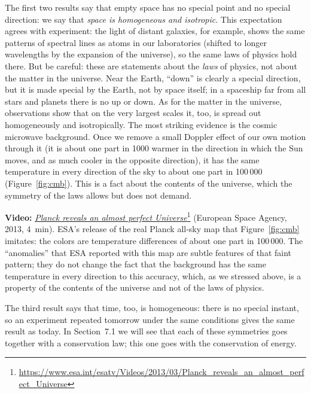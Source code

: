 \documentclass[11pt,a4paper]{article}
\begin{document}
The first two results say that empty space has no special point and no special direction: we say
that \emph{space is homogeneous and isotropic}. This expectation agrees with experiment: the light
of distant galaxies, for example, shows the same patterns of spectral lines as atoms in our
laboratories (shifted to longer wavelengths by the expansion of the universe), so the same laws of
physics hold there. But be careful: these are statements about the \emph{laws} of physics, not
about the matter in the universe. Near the Earth, ``down'' is clearly a special direction, but it is
made special by the Earth, not by space itself; in a spaceship far from all stars and planets there
is no up or down. As for the matter in the universe, observations show that on the very largest
scales it, too, is spread out homogeneously and isotropically. The most striking evidence is the
cosmic microwave background. Once we remove a small Doppler effect of our own motion through it (it
is about one part in 1000 warmer in the direction in which the Sun moves, and as much cooler in the
opposite direction), it has the same temperature in every direction of the sky to about one part in
100\,000 (Figure~\ref{fig:cmb}). This is a fact about the contents of the universe, which the
symmetry of the laws allows but does not demand.

\begin{aside}
\textbf{Video:}
\href{https://www.esa.int/esatv/Videos/2013/03/Planck_reveals_an_almost_perfect_Universe}{\emph{Planck
reveals an almost perfect
Universe}}\footnote{\url{https://www.esa.int/esatv/Videos/2013/03/Planck_reveals_an_almost_perfect_Universe}}
(European Space Agency, 2013, 4~min). ESA's release of the real Planck all-sky map that
Figure~\ref{fig:cmb} imitates: the colors are temperature differences of about one part in
100\,000. The ``anomalies'' that ESA reported with this map are subtle features of that faint
pattern; they do not change the fact that the background has the same temperature in every
direction to this accuracy, which, as we stressed above, is a property of the contents of the
universe and not of the laws of physics.
\end{aside}

The third result says that time, too, is homogeneous: there is no special instant, so an experiment
repeated tomorrow under the same conditions gives the same result as today. In Section~7.1 we will
see that each of these symmetries goes together with a conservation law; this one goes with the
conservation of energy.
\end{document}

